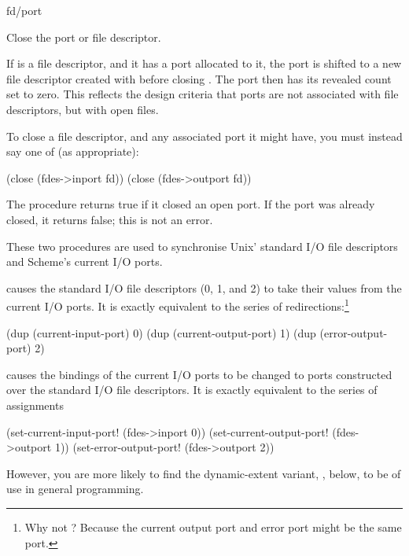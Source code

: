  {fd/port} {\boolean}
\begin{desc}
    Close the port or file descriptor.

    If  is a file descriptor, and it has a port allocated to it,
    the port is shifted to a new file descriptor created with  before closing . The port then has its revealed
    count set to zero.  This reflects the design criteria that ports are not
    associated with file descriptors, but with open files.

    To close a file descriptor, and any associated port it might have, you
    must instead say one of (as appropriate):
\begin{code}
(close (fdes->inport  fd))
(close (fdes->outport fd))\end{code}

    The procedure returns true if it closed an open port.
    If the port was already closed, it returns false; 
    this is not an error.
\end{desc}

 {\undefined}
 {\undefined}
\begin{desc}
    These two procedures are used to synchronise Unix' standard I/O
    file descriptors and Scheme's current I/O ports.

     causes the standard I/O file descriptors
    (0, 1, and 2) to take their values from the current I/O ports.
    It is exactly equivalent to the series of 
    redirections:\footnote{Why not ? 
                           Because the current output port and error port
                           might be the same port.}
\begin{code}
(dup (current-input-port)  0)
(dup (current-output-port) 1)
(dup (error-output-port)   2)\end{code}
%
     causes the bindings of the current I/O ports
    to be changed to ports constructed over the standard I/O file
    descriptors.
    It is exactly equivalent to the series of assignments
\begin{code}
(set-current-input-port!  (fdes->inport  0))
(set-current-output-port! (fdes->outport 1))
(set-error-output-port!   (fdes->outport 2))\end{code}
However, you are more likely to find the dynamic-extent variant,
, below, to be of use in general programming.
\end{desc}


